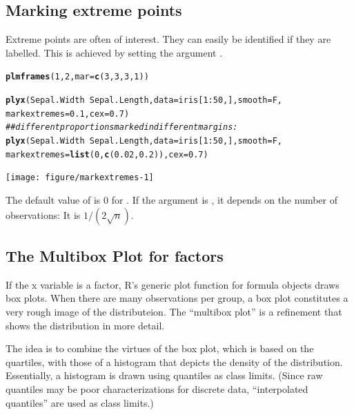 \documentclass[11pt]{article}\usepackage[]{graphicx}\usepackage[]{color}
\makeatletter
\newcommand{\hlnum}[1]{\textcolor[rgb]{0.686,0.059,0.569}{#1}}%
\newcommand{\hlcom}[1]{\textcolor[rgb]{0.678,0.584,0.686}{\textit{#1}}}%
\newcommand{\hlopt}[1]{\textcolor[rgb]{0,0,0}{#1}}%
\newcommand{\hlstd}[1]{\textcolor[rgb]{0.345,0.345,0.345}{#1}}%
\newcommand{\hlkwc}[1]{\textcolor[rgb]{0.333,0.667,0.333}{#1}}%
\newcommand{\hlkwd}[1]{\textcolor[rgb]{0.737,0.353,0.396}{\textbf{#1}}}%
\newenvironment{kframe}{%
 \def\at@end@of@kframe{}%
 \ifinner\ifhmode%
  \def\at@end@of@kframe{\end{minipage}}%
  \begin{minipage}{\columnwidth}%
 \fi\fi%
 \def\FrameCommand##1{\hskip\@totalleftmargin \hskip-\fboxsep
 \colorbox{shadecolor}{##1}\hskip-\fboxsep
     \hskip-\linewidth \hskip-\@totalleftmargin \hskip\columnwidth}%
 \MakeFramed {\advance\hsize-\width
   \@totalleftmargin\z@ \linewidth\hsize
   \@setminipage}}%
 {\par\unskip\endMakeFramed%
 \at@end@of@kframe}
\newenvironment{knitrout}{}{} %
\makeatother
\begin{document}
\subsection{Marking extreme points}

Extreme points are often of interest. They can easily be identified if they 
are labelled. This is achieved by setting the argument .

\begin{knitrout}
\color{fgcolor}\begin{kframe}
\begin{alltt}
\hlkwd{plmframes}\hlstd{(}\hlnum{1}\hlstd{,}\hlnum{2}\hlstd{,} \hlkwc{mar}\hlstd{=}\hlkwd{c}\hlstd{(}\hlnum{3}\hlstd{,}\hlnum{3}\hlstd{,}\hlnum{3}\hlstd{,}\hlnum{1}\hlstd{))}

\hlkwd{plyx}\hlstd{(Sepal.Width}\hlopt{~}\hlstd{Sepal.Length,} \hlkwc{data}\hlstd{=iris[}\hlnum{1}\hlopt{:}\hlnum{50}\hlstd{,],} \hlkwc{smooth}\hlstd{=F,}
     \hlkwc{markextremes}\hlstd{=}\hlnum{0.1}\hlstd{,} \hlkwc{cex}\hlstd{=}\hlnum{0.7}\hlstd{)}
\hlcom{## different proportions marked in different margins:}
\hlkwd{plyx}\hlstd{(Sepal.Width}\hlopt{~}\hlstd{Sepal.Length,} \hlkwc{data}\hlstd{=iris[}\hlnum{1}\hlopt{:}\hlnum{50}\hlstd{,],} \hlkwc{smooth}\hlstd{=F,}
     \hlkwc{markextremes}\hlstd{=}\hlkwd{list}\hlstd{(}\hlnum{0}\hlstd{,}\hlkwd{c}\hlstd{(}\hlnum{0.02}\hlstd{,}\hlnum{0.2}\hlstd{)),} \hlkwc{cex}\hlstd{=}\hlnum{0.7}\hlstd{)}
\end{alltt}
\end{kframe}
\texttt{[image: figure/markextremes-1]} 

\end{knitrout}
The default value of  is 0 for .
If the argument is , it depends on the number of 
observations: It is $1/(2\sqrt{n})$. 

\subsection{The Multibox Plot for factors}
If the x variable is a factor, R's generic plot function for formula objects
draws box plots.
When there are many observations per group, a box plot constitutes a 
very rough image of the distributeion.
The ``multibox plot'' is a refinement that shows the distribution in more
detail. 

The idea is to combine the virtues of the box plot, which is based on the
quartiles, with those of a histogram that depicts the density of the
distribution. 
Essentially, a histogram is drawn using quantiles as class limits.
(Since raw quantiles may be poor characterizations for discrete data,
``interpolated quantiles'' are used as class limits.)
\end{document}
